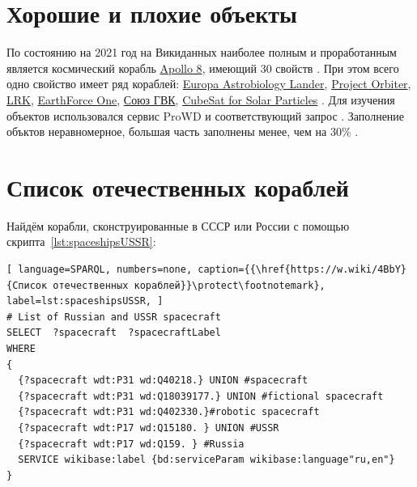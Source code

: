\section{Хорошие и плохие объекты}
По состоянию на 2021 год на Викиданных наиболее полным и проработанным является космический корабль \href{ https://www.wikidata.org/wiki/Q184201}{Apollo 8}, имеющий 30 свойств\autocite{spacecraftProWD} .
При этом всего одно свойство имеет ряд кораблей: \href{https://www.wikidata.org/wiki/Q10491365}{ Europa Astrobiology Lander}, \href{https://www.wikidata.org/wiki/Q6514453 }{ Project Orbiter}, \href{https://www.wikidata.org/wiki/Q5961734 }{ LRK}, \href{https://www.wikidata.org/wiki/Q5327028 }{ EarthForce One}, \href{https://www.wikidata.org/wiki/Q60767924 }{ Союз ГВК}, \href{https://www.wikidata.org/wiki/Q22907583 }{ CubeSat for Solar Particles}\autocite{spacecraftProWD} .
Для изучения объектов использовался сервис ProWD и соответствующий запрос \autocite{spacecraftProWD} . Заполнение объктов неравномерное, большая часть заполнены менее, чем на 30\%\autocite{spacecraftProWD} . 

\section{Список отечественных кораблей}
Найдём корабли, сконструированные в СССР или России с помощью скрипта~\ref{lst:spaceshipsUSSR}:

\begin{lstlisting}[ language=SPARQL, numbers=none, caption={{\href{https://w.wiki/4BbY}{Список отечественных кораблей}}\protect\footnotemark}, label=lst:spaceshipsUSSR, ]
# List of Russian and USSR spacecraft
SELECT  ?spacecraft  ?spacecraftLabel 
WHERE
{
  {?spacecraft wdt:P31 wd:Q40218.} UNION #spacecraft
  {?spacecraft wdt:P31 wd:Q18039177.} UNION #fictional spacecraft
  {?spacecraft wdt:P31 wd:Q402330.}#robotic spacecraft
  {?spacecraft wdt:P17 wd:Q15180. } UNION #USSR
  {?spacecraft wdt:P17 wd:Q159. } #Russia
  SERVICE wikibase:label {bd:serviceParam wikibase:language"ru,en"}
}
\end{lstlisting}

